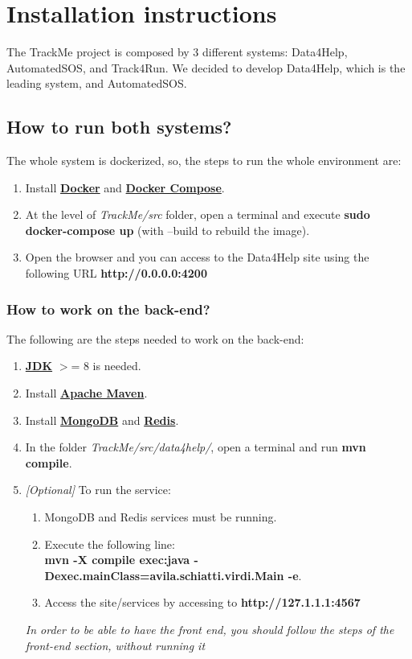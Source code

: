 \documentclass[a4paper, hidelinks, 12pt]{report}
\begin{document}
	\chapter{Installation instructions}
The TrackMe project is composed by 3 different systems: Data4Help, AutomatedSOS, and Track4Run. We decided to develop Data4Help, which is the leading system, and AutomatedSOS.

	\section{How to run both systems?}
	The whole system is dockerized, so, the steps to run the whole environment are:

	\begin{enumerate}
	\item Install \href{https://docs.docker.com/install/}{\textbf{Docker}} and \href{https://docs.docker.com/compose/install/}{\textbf{Docker Compose}}.
	\item At the level of \textit{TrackMe/src} folder, open a terminal and execute
	\textbf{sudo docker-compose up} (with --build to rebuild the image).
	\item Open the browser and you can access to the Data4Help site using the following URL
		\textbf{http://0.0.0.0:4200}
	\end{enumerate}

	\subsection{How to work on the back-end?}
	The following are the steps needed to work on the back-end:

	\begin{enumerate}
	\item \href{https://www.oracle.com/technetwork/java/javase/downloads/index.html}{\textbf{JDK}}  $>$= 8 is needed.
	\item Install \href{https://maven.apache.org/what-is-maven.html}{\textbf{Apache Maven}}.
	\item Install \href{https://docs.mongodb.com/manual/installation/}{\textbf{MongoDB}}  and \href{https://redis.io/download}{\textbf{Redis}}.
	\item In the folder \textit{TrackMe/src/data4help/}, open a terminal and run \textbf{mvn compile}.
	\item \textit{[Optional]} To run the service:
		\begin{enumerate}
		\item MongoDB and Redis services must be running.
		\item Execute the following line:\\
		\textbf{ mvn -X compile exec:java -Dexec.mainClass=avila.schiatti.virdi.Main -e}.
		\item Access the site/services by accessing to \textbf{http://127.1.1.1:4567}
		\end{enumerate}

	\textit{	In order to be able to have the front end, you should follow the steps of the front-end section, without running it}
	\end{enumerate}
\end{document}
